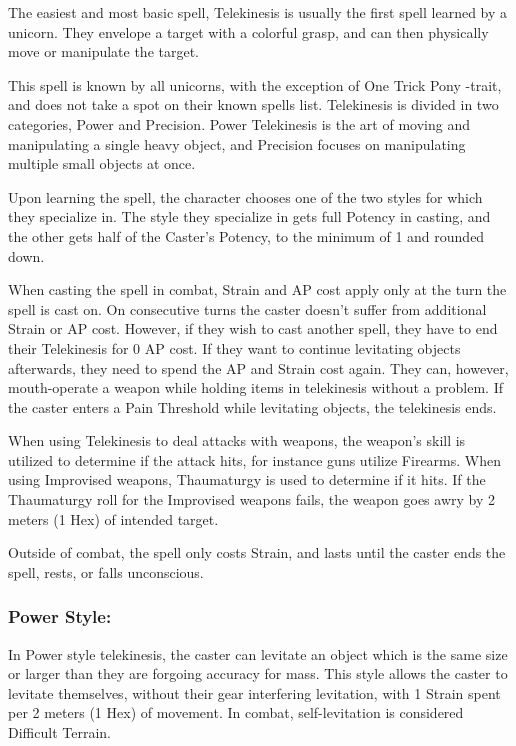 \documentclass[11pt,a4paper,twocolumn]{book}
\begin{document}
\medskip

The easiest and most basic spell, Telekinesis is usually the first spell learned by a unicorn. They envelope a target with a colorful grasp, and can then physically move or manipulate the target.

This spell is known by all unicorns, with the exception of One Trick Pony -trait, and does not take a spot on their known spells list. Telekinesis is divided in two categories, Power and Precision. Power Telekinesis is the art of moving and manipulating a single heavy object, and Precision focuses on manipulating multiple small objects at once.

Upon learning the spell, the character chooses one of the two styles for which they specialize in. The style they specialize in gets full Potency in casting, and the other gets half of the Caster's Potency, to the minimum of 1 and rounded down.

When casting the spell in combat, Strain and AP cost apply only at the turn the spell is cast on. On consecutive turns the caster doesn't suffer from additional Strain or AP cost. However, if they wish to cast another spell, they have to end their Telekinesis for 0 AP cost. If they want to continue levitating objects afterwards, they need to spend the AP and Strain cost again. They can, however, mouth-operate a weapon while holding items in telekinesis without a problem. If the caster enters a Pain Threshold while levitating objects, the telekinesis ends.

When using Telekinesis to deal attacks with weapons, the weapon's skill is utilized to determine if the attack hits, for instance guns utilize Firearms. When using Improvised weapons, Thaumaturgy is used to determine if it hits. If the Thaumaturgy roll for the Improvised weapons fails, the weapon goes awry by 2 meters (1 Hex) of intended target.

Outside of combat, the spell only costs Strain, and lasts until the caster ends the spell, rests, or falls unconscious. 

\subsubsection*{Power Style:}

In Power style telekinesis, the caster can levitate an object which is the same size or larger than they are forgoing accuracy for mass. This style allows the caster to levitate themselves, without their gear interfering levitation, with 1 Strain spent per 2 meters (1 Hex) of movement. In combat, self-levitation is considered Difficult Terrain.
\end{document}
